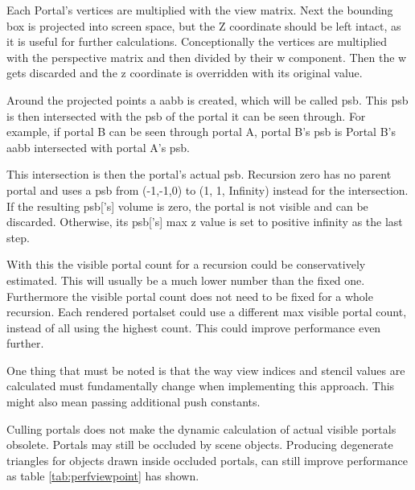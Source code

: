 Each Portal's vertices are multiplied with the view matrix. Next the bounding box is projected into screen space, but the Z coordinate should be left intact, as it is useful for further calculations. Conceptionally the vertices are multiplied with the perspective matrix and then divided by their w component. Then the w gets discarded and the z coordinate is overridden with its original value.

Around the projected points a \gls{aabb} is created, which will be called \gls{psb}. This \gls{psb} is then intersected with the \gls{psb} of the portal it can be seen through. For example, if portal B can be seen through portal A, portal B's \gls{psb} is Portal B's \gls{aabb} intersected with portal A's \gls{psb}.

This intersection is then the portal's actual \gls{psb}. Recursion zero has no parent portal and uses a \gls{psb} from (-1,-1,0) to (1, 1, Infinity) instead for the intersection. If the resulting \gls{psb}['s] volume is zero, the portal is not visible and can be discarded. Otherwise, its \gls{psb}['s] max z value is set to positive infinity as the last step.




With this the visible portal count for a recursion could be conservatively estimated. This will usually be a much lower number than the fixed one. Furthermore the visible portal count does not need to be fixed for a whole recursion. Each rendered \gls{portalset} could use a different max visible portal count, instead of all using the highest count. This could improve performance even further.

One thing that must be noted is that the way view indices and stencil values are calculated must fundamentally change when implementing this approach. This might also mean passing additional push constants.

Culling portals does not make the dynamic calculation of actual visible portals obsolete. Portals may still be occluded by scene objects. Producing degenerate triangles for objects drawn inside occluded portals, can still improve performance as table \ref{tab:perfviewpoint} has shown.

